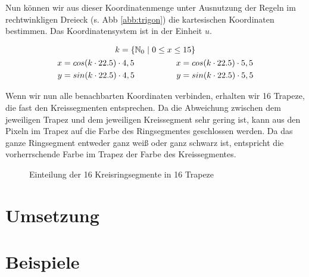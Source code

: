 Nun können wir aus dieser Koordinatenmenge unter Ausnutzung der Regeln im rechtwinkligen Dreieck (s. Abb \ref{abb:trigon}) die kartesischen Koordinaten bestimmen. Das Koordinatensystem ist in der Einheit \(u\).

\begin{gather}
k = \{\mathbb{N}_0 \hspace{0.3em}|\hspace{0.3em} 0 \le x \le 15\} \\
\begin{split}
x &= cos(k \cdot 22.5) \cdot 4,5 \\
y &= sin(k \cdot 22.5) \cdot 4,5
\end{split}
\hspace{5em}
\begin{split}
x &= cos(k \cdot 22.5) \cdot 5,5 \\
y &= sin(k \cdot 22.5) \cdot 5,5
\end{split}
\end{gather}

Wenn wir nun alle benachbarten Koordinaten verbinden, erhalten wir 16 Trapeze, die fast den Kreissegmenten entsprechen. Da die Abweichung zwischen dem jeweiligen Trapez und dem jeweiligen Kreissegment sehr gering ist, kann aus den Pixeln im Trapez auf die Farbe des Ringsegmentes geschlossen werden. Da das ganze Ringsegment entweder ganz weiß oder ganz schwarz ist, entspricht die vorherrschende Farbe im Trapez der Farbe des Kreissegmentes.

\begin{figure}[!ht]
	\centering	
	
	\caption{Einteilung der 16 Kreisringsegmente in 16 Trapeze}
\end{figure}
\section{Umsetzung}
\section{Beispiele}